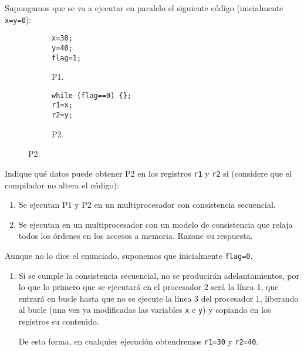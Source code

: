 \begin{ejercicio}
    Supongamos que se va a ejecutar en paralelo el siguiente código (inicialmente \verb|x=y=0|):
    \begin{figure}[H]
        \centering
        \begin{subfigure}{0.3\textwidth}
            \begin{verbatim}
x=30;
y=40;
flag=1;
            \end{verbatim}
            \caption{P1.}
        \end{subfigure}\hspace{3cm}
        \begin{subfigure}{0.3\textwidth}
            \begin{verbatim}
while (flag==0) {};
r1=x;
r2=y;
            \end{verbatim}
            \caption{P2.}            
        \end{subfigure}
    \end{figure}

    Indique qué datos puede obtener P2 en los registros \verb|r1| y \verb|r2| si (considere que el compilador no altera el código):
    \begin{enumerate}
        \item Se ejecutan P1 y P2 en un multiprocesador con consistencia secuencial.
        \item Se ejecutan en un multiprocesador con un modelo de consistencia que relaja todos los órdenes en los accesos a memoria. Razone su respuesta.
    \end{enumerate}

Aunque no lo dice el enunciado, suponemos que inicialmente \verb|flag=0|.
\begin{enumerate}
    \item Si se cumple la consistencia secuencial, no se producirán adelantamientos, por lo que lo primero que se ejecutará en el procesador 2 será la línea 1, que entrará en bucle hasta que no se ejecute la línea 3 del procesador 1, liberando al bucle (una vez ya modificadas las variables \verb|x| e \verb|y|) y copiando en los registros su contenido.

        De esta forma, en cualquier ejecución obtendremos \verb|r1=30| y \verb|r2=40|.


\end{enumerate}
\end{ejercicio}
